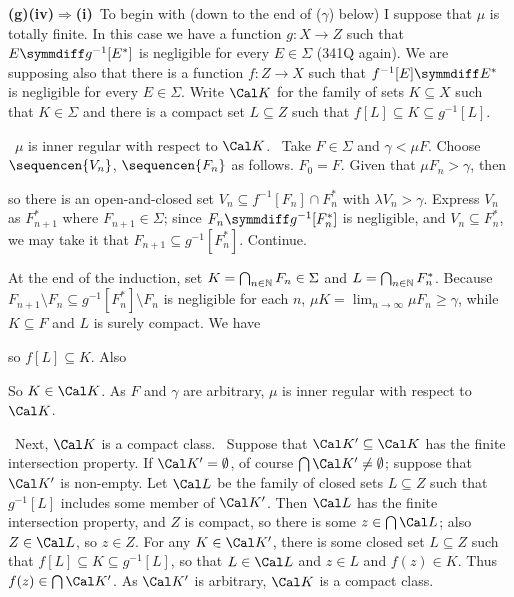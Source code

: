 {\medskip

{\bf (g)(iv)$\Rightarrow$(i)}\grheada\ To begin with (down to the end of
($\gamma$) below) I suppose that $\mu$ is totally finite.   In this case
we have a function $g:X\to Z$ such that $E\symmdiff g^{-1}[E^*]$ is
negligible
for every $E\in\Sigma$ (341Q again).    We are supposing also that
there is a function $f:Z\to X$ such that $f^{-1}[E]\symmdiff E^*$
is negligible for every $E\in\Sigma$.   Write $\Cal K$ for the family of
sets $K\subseteq X$ such that $K\in\Sigma$ and there is a compact set
$L\subseteq Z$ such that $f[L]\subseteq K\subseteq g^{-1}[L]$.

\medskip

\quad\grheadb\ $\mu$ is inner regular with respect to $\Cal K$.   \Prf\
Take $F\in\Sigma$ and $\gamma<\mu F$.   Choose $\sequencen{V_n}$,
$\sequencen{F_n}$
as follows.  $F_0=F$.   Given that $\mu F_n>\gamma$, then


\noindent so there is an open-and-closed set
$V_n\subseteq f^{-1}[F_n]\cap F_n^*$ with $\lambda V_n>\gamma$.
Express $V_n$ as $F_{n+1}^*$ where
$F_{n+1}\in\Sigma$;  since $F_n\symmdiff g^{-1}[F_n^*]$ is negligible,
and $V_n\subseteq F_n^*$, we may take it that
$F_{n+1}\subseteq g^{-1}[F_n^*]$.   Continue.

At the end of the induction, set $K=\bigcap_{n\in\Bbb N}F_n\in\Sigma$
and $L=\bigcap_{n\in\Bbb N}F_n^*$.   Because
$F_{n+1}\setminus F_n\subseteq g^{-1}[F_n^*]\setminus F_n$ is negligible
for each $n$,
$\mu K=\lim_{n\to\infty}\mu F_n\ge\gamma$, while $K\subseteq F$ and $L$
is surely compact.   We have


\noindent so $f[L]\subseteq K$.   Also


\noindent So $K\in\Cal K$.   As $F$ and $\gamma$ are arbitrary, $\mu$ is
inner regular with respect to $\Cal K$.\ \Qed

\medskip

\quad\grheadc\ Next, $\Cal K$ is a compact class.   \Prf\ Suppose that
$\Cal K'\subseteq\Cal K$ has the finite intersection property.   If
$\Cal K'=\emptyset$, of course $\bigcap\Cal K'\ne\emptyset$;  suppose
that $\Cal K'$ is non-empty.   Let $\Cal L$ be the family of closed sets
$L\subseteq Z$
such that $g^{-1}[L]$ includes some member of $\Cal K'$.   Then $\Cal L$
has the finite intersection property, and $Z$ is compact, so there is
some $z\in\bigcap\Cal L$;  also $Z\in\Cal L$, so $z\in Z$.   For any
$K\in\Cal K'$, there is some closed set $L\subseteq Z$ such that
$f[L]\subseteq
K\subseteq g^{-1}[L]$, so that $L\in\Cal L$ and $z\in L$ and $f(z)\in
K$.   Thus $f(z)\in\bigcap\Cal K'$.   As $\Cal K'$ is arbitrary, $\Cal
K$ is a compact class.\ \Qed

}
